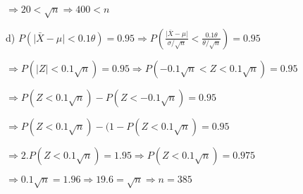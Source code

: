 \documentclass{article}
\providecommand{\abs}[1]{\lvert#1\rvert}
\begin{document}
$\Longrightarrow 20<\sqrt{n} \Longrightarrow 400<n$
\vspace{6mm}

d)
$P(\abs{\bar{X}-\mu}<0.1\theta) = 0.95 \Longrightarrow P(\frac{\abs{\bar{X}-\mu}}{\sigma/\sqrt{n}}<\frac{0.1\theta}{\theta/\sqrt{n}}) = 0.95 $
\vspace{3mm}

$\Longrightarrow P(\abs{Z}<0.1\sqrt{n}) = 0.95 \Longrightarrow P(-0.1\sqrt{n}<Z<0.1\sqrt{n}) = 0.95 $
\vspace{3mm}

$\Longrightarrow P(Z<0.1\sqrt{n})-P(Z<-0.1\sqrt{n}) = 0.95 $
\vspace{3mm}

$\Longrightarrow P(Z<0.1\sqrt{n})-(1 -P(Z<0.1\sqrt{n}) = 0.95 $
\vspace{3mm}

$\Longrightarrow 2.P(Z<0.1\sqrt{n}) = 1.95 \Longrightarrow P(Z<0.1\sqrt{n}) = 0.975 $
\vspace{3mm}

$\Longrightarrow 0.1\sqrt{n} = 1.96 \Longrightarrow 19.6 = \sqrt{n}\Longrightarrow n = 385$
\end{document}
